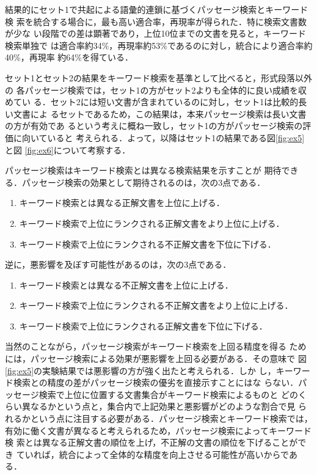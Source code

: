 結果的にセット1で共起による語彙的連鎖に基づくパッセージ検索とキーワード検
索を統合する場合に，最も高い適合率，再現率が得られた．特に検索文書数が少な
い段階での差は顕著であり，上位10位までの文書を見ると，キーワード検索単独で
は適合率約34\%，再現率約53\%であるのに対し，統合により適合率約40\%，再現率
約64\%を得ている．

セット1とセット2の結果をキーワード検索を基準として比べると，形式段落以外の
各パッセージ検索では，セット1の方がセット2よりも全体的に良い成績を収めてい
る．セット2には短い文書が含まれているのに対し，セット1は比較的長い文書によ
るセットであるため，この結果は，本来パッセージ検索は長い文書の方が有効であ
るという考えに概ね一致し，セット1の方がパッセージ検索の評価に向いていると
考えられる．よって，以降はセット1の結果である図\ref{fig:ex5}と図
\ref{fig:ex6}について考察する．

パッセージ検索はキーワード検索とは異なる検索結果を示すことが
期待できる．パッセージ検索の効果として期待されるのは，次の3点である．

\begin{enumerate}
\item キーワード検索とは異なる正解文書を上位に上げる．
\item キーワード検索で上位にランクされる正解文書をより上位に上げる．
\item キーワード検索で上位にランクされる不正解文書を下位に下げる．
\end{enumerate}

逆に，悪影響を及ぼす可能性があるのは，次の3点である．
\begin{enumerate}
\item キーワード検索とは異なる不正解文書を上位に上げる．
\item キーワード検索で上位にランクされる不正解文書をより上位に上げる．
\item キーワード検索で上位にランクされる正解文書を下位に下げる．
\end{enumerate}

当然のことながら，パッセージ検索がキーワード検索を上回る精度を得る
ためには，パッセージ検索による効果が悪影響を上回る必要がある．その意味で
図\ref{fig:ex5}の実験結果では悪影響の方が強く出たと考えられる．しか
し，キーワード検索との精度の差がパッセージ検索の優劣を直接示すことにはな
らない．パッセージ検索で上位に位置する文書集合がキーワード検索によるものと
どのくらい異なるかという点と，集合内で上記効果と悪影響がどのような割合で見
られるかという点に注目する必要がある．パッセージ検索とキーワード検索では，
有効に働く文書が異なると考えられるため，パッセージ検索によってキーワード検
索とは異なる正解文書の順位を上げ，不正解の文書の順位を下げることができ
ていれば，統合によって全体的な精度を向上させる可能性が高いからである．

